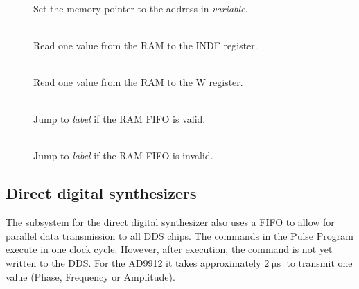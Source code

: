 \documentclass[11pt]{scrartcl}
\newcommand{\unit}[1]{\ensuremath{\operatorname{#1}}}
\begin{document}
\begin{addmargin}{1cm}
\begin{description}
\item[ ] \hfill\\  
Set the memory pointer to the address in {\it variable}.

\item[] \hfill\\  
Read one value from the RAM to the INDF register.

\item[]\hfill\\  
Read one value from the RAM to the W register.

\item[ ]\hfill\\  
Jump to {\it label} if the RAM FIFO is valid.

\item[ ]\hfill\\  
Jump to {\it label} if the RAM FIFO is invalid.
\end{description}
\end{addmargin}

\subsection{Direct digital synthesizers}
The subsystem for the direct digital synthesizer  also uses a FIFO to allow for parallel data transmission to all DDS chips. The commands in the Pulse Program execute in one clock cycle. However, after execution, the command is not yet written to the DDS. For the AD9912 it takes approximately $2\unit{\mu s}$ to transmit one value (Phase, Frequency or Amplitude).
\end{document}
